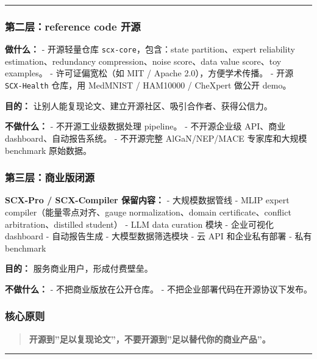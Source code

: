 \documentclass[
  12pt,
]{ctexart}
\begin{document}
\begin{center}\rule{0.5\linewidth}{0.5pt}\end{center}

\subsubsection{第二层：reference code
开源}\label{ux7b2cux4e8cux5c42reference-code-ux5f00ux6e90}

\textbf{做什么：} - 开源轻量仓库 \texttt{scx-core}，包含：state
partition、expert reliability estimation、redundancy compression、noise
score、data value score、toy examples。 - 许可证偏宽松（如 MIT / Apache
2.0），方便学术传播。 - 开源 \texttt{SCX-Health} 仓库，用 MedMNIST /
HAM10000 / CheXpert 做公开 demo。

\textbf{目的：} 让别人能复现论文、建立开源社区、吸引合作者、获得公信力。

\textbf{不做什么：} - 不开源工业级数据处理 pipeline。 - 不开源企业级
API、商业 dashboard、自动报告系统。 - 不开源完整 AlGaN/NEP/MACE
专家库和大规模 benchmark 原始数据。

\subsubsection{第三层：商业版闭源}\label{ux7b2cux4e09ux5c42ux5546ux4e1aux7248ux95edux6e90}

\textbf{SCX-Pro / SCX-Compiler 保留内容：} - 大规模数据管线 - MLIP
expert compiler（能量零点对齐、gauge normalization、domain
certificate、conflict arbitration、distilled student） - LLM data
curation 模块 - 企业可视化 dashboard - 自动报告生成 - 大模型数据筛选模块
- 云 API 和企业私有部署 - 私有 benchmark

\textbf{目的：} 服务商业用户，形成付费壁垒。

\textbf{不做什么：} - 不把商业版放在公开仓库。 -
不把企业部署代码在开源协议下发布。

\subsubsection{核心原则}\label{ux6838ux5fc3ux539fux5219}

\begin{quote}
\textbf{开源到''足以复现论文''，不要开源到''足以替代你的商业产品''。}
\end{quote}

\begin{center}\rule{0.5\linewidth}{0.5pt}\end{center}
\end{document}
